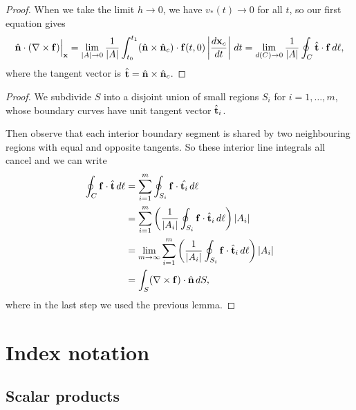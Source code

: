 \documentclass[10pt, a4paper]{article}
\begin{document}
\begin{lemma}
\begin{proof}
        When we take the limit $h \to 0$,
        we have $v_{*}(t) \to 0$ for all $t$,
        so our first equation gives
        \[
        \hat{\mathbf{n}} \cdot (\mathbf{\nabla} \times \mathbf{f})\Bigr\rvert_{\mathbf{x}} = \lim_{|A| \to 0}\frac{1}{|A|}\int_{t_0}^{t_1}(\hat{\mathbf{n}} \times \hat{\mathbf{n}}_{c}) \cdot \mathbf{f}(t, 0)\left|\frac{d\mathbf{x}_c}{dt}\right|\,dt = \lim_{d(C) \to 0}\frac{1}{|A|}\oint_{C}\hat{\mathbf{t}}\cdot\mathbf{f}\,d\ell,
        \]
        where the tangent vector is $\hat{\mathbf{t}} = \hat{\mathbf{n}} \times \hat{\mathbf{n}}_{c}$.
    \end{proof}
\end{lemma}


\begin{theorem}[continues = prep:mathmethII:thm:stokesthm]
    \begin{proof}
        We subdivide $S$ into a disjoint union of small regions $S_i$ for $i = 1, \dotsc, m$,
        whose boundary curves have unit tangent vector $\hat{\mathbf{t}}_i$.

        Then observe that each interior boundary segment is shared by two neighbouring regions with equal and opposite tangents.
        So these interior line integrals all cancel and we can write
        \begin{align*}
            \oint_{C}\mathbf{f}\cdot\hat{\mathbf{t}}\,d\ell &= \sum_{i = 1}^{m}\oint_{S_i}\mathbf{f}\cdot\hat{\mathbf{t}_i}\,d\ell \\
            &= \sum_{i = 1}^{m}\left(\frac{1}{|A_i|}\oint_{S_i}\mathbf{f} \cdot \hat{\mathbf{t}}_i\,d\ell\right)|A_i| \\
            &= \lim_{m \to \infty}\sum_{i = 1}^{m}\left(\frac{1}{|A_i|}\oint_{S_i}\mathbf{f} \cdot \hat{\mathbf{t}}_i\,d\ell\right)|A_i| \\
            &= \int_{S}(\mathbf{\nabla} \times \mathbf{f}) \cdot \hat{\mathbf{n}}\,dS,
        \end{align*}
        where in the last step we used the previous lemma.
    \end{proof}
\end{theorem}

\newpage

\section{Index notation}

\subsection{Scalar products}
\end{document}
